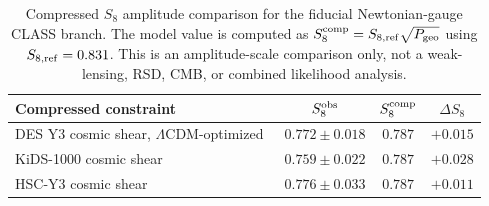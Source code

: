 \begin{table}[b]
\centering
\begin{tabular}{lccc}
\toprule
Compressed constraint & $S_8^{\rm obs}$ & $S_8^{\rm comp}$ & $\Delta S_8$ \\
\midrule
DES Y3 cosmic shear, $\Lambda$CDM-optimized~\cite{DESY3Shear} & $0.772\pm0.018$ & $0.787$ & $+0.015$ \\
KiDS-1000 cosmic shear~\cite{KiDS1000} & $0.759\pm0.022$ & $0.787$ & $+0.028$ \\
HSC-Y3 cosmic shear~\cite{HSCY3Shear} & $0.776\pm0.033$ & $0.787$ & $+0.011$ \\
\bottomrule
\end{tabular}
\caption{Compressed $S_8$ amplitude comparison for the fiducial Newtonian-gauge CLASS branch. The model value is computed as $S_{8}^{\rm comp}=S_{8,\rm ref}\sqrt{P_{\rm geo}}$ using $S_{8,\rm ref}=0.831$. This is an amplitude-scale comparison only, not a weak-lensing, RSD, CMB, or combined likelihood analysis.}
\label{tab:compressed_s8_comparison}
\end{table}